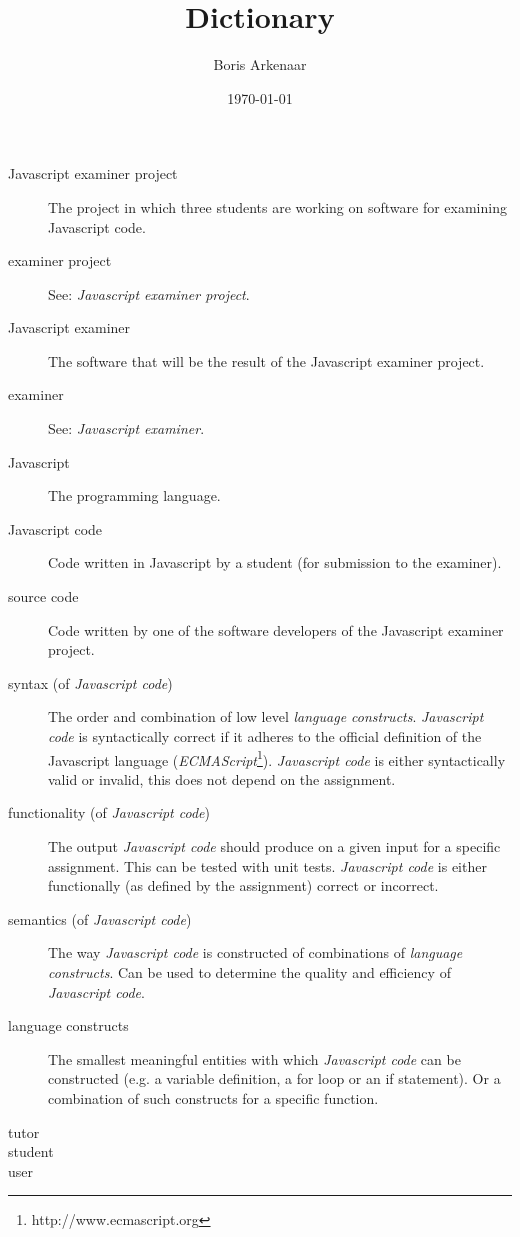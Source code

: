 \documentclass{article}
\begin{document}
\title{Dictionary}
\author{Boris Arkenaar}
\date{\today}
\maketitle

\begin{description}
  \item[Javascript examiner project] The project in which three students are
    working on software for examining Javascript code.
  \item[examiner project] See: {\em Javascript examiner project}.
  \item[Javascript examiner] The software that will be the result of the
    Javascript examiner project.
  \item[examiner] See: {\em Javascript examiner}.
  \item[Javascript] The programming language.
  \item[Javascript code] Code written in Javascript by a student (for
    submission to the examiner).
  \item[source code] Code written by one of the software developers of the
    Javascript examiner project.
  \item[syntax (of {\em Javascript code})] The order and combination of low
    level {\em language constructs}. {\em Javascript code} is syntactically
    correct if it adheres to the official definition of the Javascript language
    ({\em ECMAScript}\footnote{http://www.ecmascript.org}). {\em Javascript
    code} is either syntactically valid or invalid, this does not depend on the
    assignment.
  \item[functionality (of {\em Javascript code})] The output {\em Javascript
    code} should produce on a given input for a specific assignment. This can
    be tested with unit tests. {\em Javascript code} is either functionally (as
    defined by the assignment) correct or incorrect.
  \item[semantics (of {\em Javascript code})] The way {\em Javascript code} is
    constructed of combinations of {\em language constructs}. Can be used to
    determine the quality and efficiency of {\em Javascript code}.
  \item[language constructs] The smallest meaningful entities with which {\em
    Javascript code} can be constructed (e.g. a variable definition, a for loop
    or an if statement). Or a combination of such constructs for a specific
    function.
  \item[tutor] 
  \item[student]
  \item[user]

\end{description}
\end{document}
